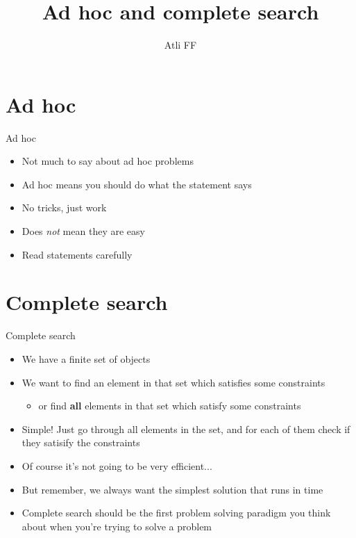 \documentclass{beamer}
\title{Ad hoc and complete search}
\author{Atli FF}
\institute{\href{http://ru.is/td}{School of Computer Science} \\[2pt] \href{http://ru.is}{Reykjavík University}}
\begin{document}
\maketitle

\section*{Ad hoc}

\begin{frame}[plain]{Ad hoc}
    \begin{itemize}
        \item Not much to say about ad hoc problems
        \item Ad hoc means you should do what the statement says
        \item No tricks, just work
        \item Does \textit{not} mean they are easy
        \item Read statements carefully
    \end{itemize}
\end{frame}

\section*{Complete search}

\begin{frame}[plain]{Complete search}
    \begin{itemize}
        \item We have a finite set of objects
        \item We want to find an element in that set which satisfies some constraints
        \begin{itemize}
            \item or find \textbf{all} elements in that set which satisfy some constraints
        \end{itemize}

        \vspace{5pt}
        \item Simple! Just go through all elements in the set, and for each of them check if they satisify the constraints
        \item Of course it's not going to be very efficient...
        \item But remember, we always want the simplest solution that runs in time
        \item Complete search should be the first problem solving paradigm you think about when you're trying to solve a problem
    \end{itemize}
\end{frame}
\end{document}
